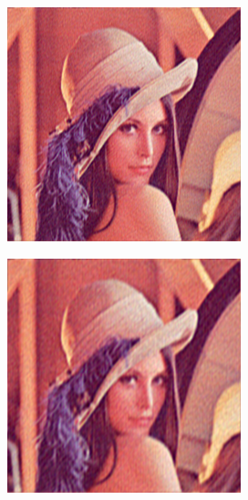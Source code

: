\documentclass[11pt]{report}
\theoremstyle{plain}
\theoremstyle{remark}
\begin{document}
\pagebreak
{}
\begin{figure}
	\centering
	\begin{subfigure}[b]{0.24\textwidth}
		\centering
		\includegraphics[width=\textwidth]{plaatjes/Lenna_fourier_0_1.png}
	\end{subfigure}
	\begin{subfigure}[b]{0.24\textwidth}
		\centering
		\includegraphics[width=\textwidth]{plaatjes/Lenna_fourier_0_05.png}

\end{subfigure}
\end{figure}
\end{document}
